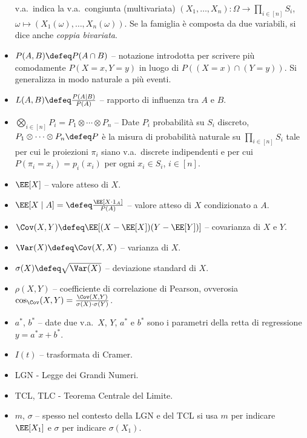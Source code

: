 \begin{multicols*}{2}
\begin{itemize}
        v.a.~indica la v.a.~congiunta (multivariata) $(X_1, \ldots, X_n) : \Omega \to \prod_{i \in [n]} S_i$, $\omega \mapsto (X_1(\omega), \ldots, X_n(\omega))$. Se la
        famiglia è composta da due variabili, si dice anche \textit{coppia bivariata}.
        \item $P(A, B) \defeq P(A \cap B)$ -- notazione introdotta per scrivere
        più comodamente $P(X = x, Y = y)$ in luogo di $P((X = x) \cap (Y = y))$. Si
        generalizza in modo naturale a più eventi.
        \item $L(A, B) \defeq \frac{P(A \mid B)}{P(A)}$ -- rapporto di influenza tra
        $A$ e $B$.
        \item $\bigotimes_{i \in [n]} P_i = P_1 \otimes \cdots \otimes P_n$ --
        Date $P_i$ probabilità su $S_i$ discreto, $P_1 \otimes \cdots \otimes P_n \defeq P$ è la misura di probabilità naturale su $\prod_{i \in [n]} S_i$ tale per cui
        le proiezioni $\pi_i$ siano v.a.~discrete indipendenti e per cui
        $P(\pi_i = x_i) = p_i(x_i)$ per ogni $x_i \in S_i$, $i \in [n]$.
        \item $\EE[X]$ -- valore atteso di $X$.
        \item $\EE[X \mid A] = \defeq \frac{\EE[X \cdot 1_A]}{P(A)}$ -- valore atteso di $X$
        condizionato a $A$.
        \item $\Cov(X, Y) \defeq \EE[(X - \EE[X])(Y - \EE[Y])]$ -- covarianza di $X$ e $Y$.
        \item $\Var(X) \defeq \Cov(X, X)$ -- varianza di $X$.
        \item $\sigma(X) \defeq \sqrt{\Var(X)}$ -- deviazione standard di $X$.
        \item $\rho(X, Y)$ -- coefficiente
        di correlazione di Pearson, ovverosia
        $\cos_{\Cov}(X, Y) = \frac{\Cov(X, Y)}{\sigma(X) \cdot \sigma(Y)}$.
        \item $a^*$, $b^*$ -- date due
        v.a.~$X$, $Y$, $a^*$ e $b^*$ sono
        i parametri della retta di
        regressione $y = a^*x + b^*$.
        \item $I(t)$ -- trasformata di Cramer.
        \item LGN - Legge dei Grandi Numeri.
        \item TCL, TLC - Teorema Centrale del Limite.
        \item $m$, $\sigma$ -- spesso nel contesto
        della LGN e del TCL si usa $m$ per
        indicare $\EE[X_1]$ e $\sigma$ per
        indicare $\sigma(X_1)$.
    \end{itemize}
\end{multicols*}
